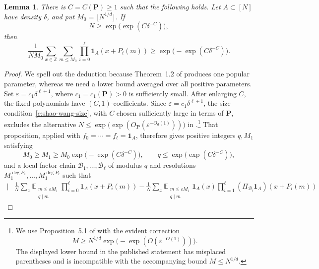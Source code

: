 \documentclass{amsart}
\newcommand{\E}{\mathbb E}
\newcommand{\Z}{\mathbb Z}
\newcommand{\1}{\mathbf 1}
\newtheorem{lemma}[theorem]{Lemma}
\begin{document}
\begin{lemma}\label{l:shao-wang}
There is $C=C(\mathbf P)\geq1$ such that the following holds.  Let
$A\subset[N]$ have density $\delta$, and put
$M_0=\lfloor N^{1/d}\rfloor$.  If
\begin{equation}\label{e:shao-wang-size}
 N\geq\exp\!\bigl(\exp(C\delta^{-C})\bigr),
\end{equation}
then
\begin{equation}\label{e:shao-wang-count}
 \frac1{NM_0}\sum_{x\in\Z}\sum_{m\leq M_0}
 \prod_{i=0}^{\ell}\1_A(x+P_i(m))
 \geq\exp\!\bigl(-\exp(C\delta^{-C})\bigr).
\end{equation}
\end{lemma}

\begin{proof}
We spell out the deduction because Theorem~1.2 of \cite{ShaoWang}
produces one popular parameter, whereas we need a lower bound averaged
over all positive parameters.  Set
$\varepsilon=c_1\delta^{\ell+1}$, where
$c_1=c_1(\mathbf P)>0$ is sufficiently small.  After enlarging $C$,
the fixed polynomials have $(C,1)$-coefficients.  Since $\varepsilon=c_1\delta^{\ell+1}$, the size
condition~\eqref{e:shao-wang-size}, with $C$ chosen sufficiently large
in terms of $\mathbf P$, excludes the alternative $ N\leq\exp\!\bigl(\exp(O_{\mathbf P}
 (\varepsilon^{-O_d(1)}))\bigr)$
in \cite[Proposition~5.1]{ShaoWang}.\footnote{We use
Proposition~5.1 of \cite{ShaoWang} with the evident correction
\[
 M\geq N^{1/d}\exp\!\bigl(-\exp(O(\varepsilon^{-O(1)}))\bigr).
\]
The displayed lower bound in the published statement has misplaced
parentheses and is incompatible with the accompanying bound
\(M\leq N^{1/d}\).}
That proposition, applied with
$f_0=\cdots=f_\ell=\1_A$, therefore gives positive integers $q,M_1$
satisfying
\begin{equation}\label{e:shao-wang-parameters}
 M_0\geq M_1\geq
 M_0\exp\!\bigl(-\exp(C\delta^{-C})\bigr),
 \qquad q\leq\exp\!\bigl(\exp(C\delta^{-C})\bigr),
\end{equation}
and a local factor chain
$\mathcal B_1,\ldots,\mathcal B_\ell$ of modulus $q$ and resolutions
$M_1^{\deg P_1},\ldots,M_1^{\deg P_\ell}$ such that
\begin{align}\label{e:shao-wang-regularity}
 \bigg|&
 \frac1N\sum_x
 \E_{\substack{m\leq\varepsilon M_1\\q\mid m}}
 \prod_{i=0}^{\ell}\1_A(x+P_i(m))-\frac1N\sum_x
 \E_{\substack{m\leq\varepsilon M_1\\q\mid m}}
 \1_A(x)\prod_{i=1}^{\ell}
 (\Pi_{\mathcal B_i}\1_A)(x+P_i(m))

\end{align}
\end{proof}
\end{document}
